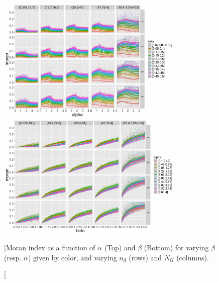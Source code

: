 \begin{figure}
\centering
\includegraphics[width=0.8\textwidth]{Figures/Density/moran_alpha}
\includegraphics[width=0.8\textwidth]{Figures/Density/moran_beta}
\caption[][]{Moran index as a function of $\alpha$ (Top) and $\beta$ (Bottom) for varying $\beta$ (resp. $\alpha$) given by color, and varying $n_d$ (rows) and $N_G$ (columns).}{}
\label{fig:moran}
\end{figure}

